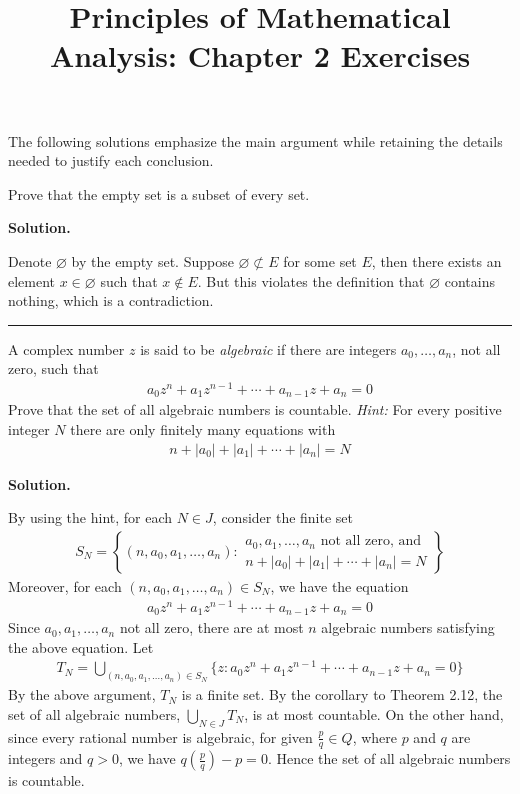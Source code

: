 \documentclass[12pt]{article}
\title{Principles of Mathematical Analysis: Chapter 2 Exercises}
\date{}
\theoremstyle{definition}
\begin{document}
\maketitle
\noindent The following solutions emphasize the main argument while retaining the details needed to justify each conclusion.

Prove that the empty set is a subset of every set.

\smallskip
\noindent\textbf{Solution.}\quad

Denote $\varnothing$ by the empty set. Suppose $\varnothing\not\subset E$ for some set $E$, then there exists an element $x\in\varnothing$ such that $x\notin E$. But this violates the definition that $\varnothing$ contains nothing, which is a contradiction.



\bigskip\noindent\hrule\bigskip

A complex number $z$ is said to be \textit{algebraic} if there are integers $a_0,\ldots,a_n$, not all zero, such that
\begin{align*}
a_0z^n+a_1z^{n-1}+\cdots+a_{n-1}z+a_n=0
\end{align*}
Prove that the set of all algebraic numbers is countable. \textit{Hint:} For every positive integer $N$ there are only finitely many equations with
\begin{align*}
n+\left\vert a_0\right\vert+\left\vert a_1\right\vert+\cdots+\left\vert a_n\right\vert=N
\end{align*}

\smallskip
\noindent\textbf{Solution.}\quad

By using the hint, for each $N\in J$, consider the finite set
\begin{align*}
S_N=\left\{(n,a_0,a_1,\ldots,a_n):
\begin{array}{l}
a_0,a_1,\ldots,a_n\mbox{ not all zero, and}\\
n+\left\vert a_0\right\vert+\left\vert a_1\right\vert+\cdots+\left\vert a_n\right\vert=N
\end{array}\right\}
\end{align*}
Moreover, for each $(n,a_0,a_1,\ldots,a_n)\in S_N$, we have the equation
\begin{align*}
a_0z^n+a_1z^{n-1}+\cdots+a_{n-1}z+a_n=0
\end{align*}
Since $a_0,a_1,\ldots,a_n$ not all zero, there are at most $n$ algebraic numbers satisfying the above equation. Let
\begin{align*}
T_N=\bigcup_{(n,a_0,a_1,\ldots,a_n)\in S_N}\{z:a_0z^n+a_1z^{n-1}+\cdots+a_{n-1}z+a_n=0\}
\end{align*}
By the above argument, $T_N$ is a finite set. By the corollary to Theorem 2.12, the set of all algebraic numbers, $\bigcup_{N\in J}T_N$, is at most countable. On the other hand, since every rational number is algebraic, for given $\frac{p}{q}\in Q$, where $p$ and $q$ are integers and $q>0$, we have $q\left(\frac{p}{q}\right)-p=0$. Hence the set of all algebraic numbers is countable.
\end{document}

